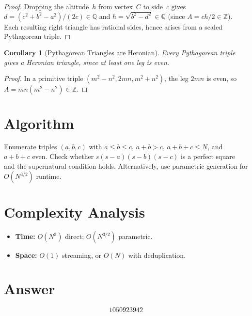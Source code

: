 \documentclass[11pt]{article}
\newtheorem{corollary}[theorem]{Corollary}
\begin{document}
\begin{proof}
Dropping the altitude~$h$ from vertex~$C$ to side~$c$ gives $d=(c^2+b^2-a^2)/(2c)\in\mathbb{Q}$ and $h=\sqrt{b^2-d^2}\in\mathbb{Q}$ (since $A=ch/2\in\mathbb{Z}$). Each resulting right triangle has rational sides, hence arises from a scaled Pythagorean triple.
\end{proof}

\begin{corollary}[Pythagorean Triangles are Heronian]
Every Pythagorean triple gives a Heronian triangle, since at least one leg is even.
\end{corollary}

\begin{proof}
In a primitive triple $(m^2-n^2,2mn,m^2+n^2)$, the leg $2mn$ is even, so $A=mn(m^2-n^2)\in\mathbb{Z}$.
\end{proof}

\section{Algorithm}

Enumerate triples $(a,b,c)$ with $a\le b\le c$, $a+b>c$, $a+b+c\le N$, and $a+b+c$ even. Check whether $s(s-a)(s-b)(s-c)$ is a perfect square and the supernatural condition holds. Alternatively, use parametric generation for $O(N^{3/2})$ runtime.

\section{Complexity Analysis}

\begin{itemize}
\item \textbf{Time:} $O(N^3)$ direct; $O(N^{3/2})$ parametric.
\item \textbf{Space:} $O(1)$ streaming, or $O(N)$ with deduplication.
\end{itemize}

\section{Answer}

\[
\boxed{1050923942}
\]
\end{document}
